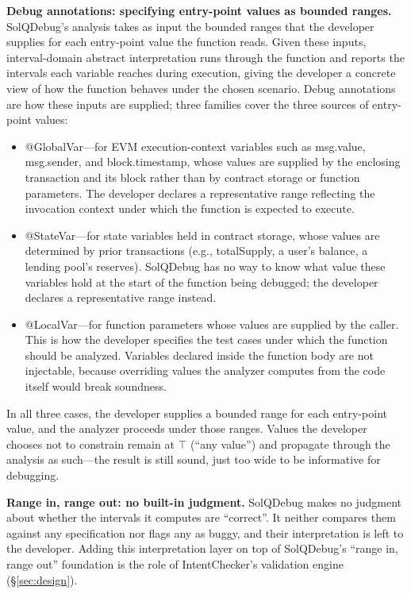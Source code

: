 \documentclass[pdflatex,sn-basic]{sn-jnl}%
\theoremstyle{thmstyleone}%
\theoremstyle{thmstyletwo}%
\theoremstyle{thmstylethree}%
\begin{document}
\smallskip
\noindent\textbf{Debug annotations: specifying entry-point values as bounded ranges.}
SolQDebug's analysis takes as input the bounded ranges that the developer supplies for each entry-point value the function reads.
Given these inputs, interval-domain abstract interpretation runs through the function and reports the intervals each variable reaches during execution, giving the developer a concrete view of how the function behaves under the chosen scenario.
Debug annotations are how these inputs are supplied; three families cover the three sources of entry-point values:
\begin{itemize}
    \item @GlobalVar---for EVM execution-context variables such as msg.value, msg.sender, and block.timestamp, whose values are supplied by the enclosing transaction and its block rather than by contract storage or function parameters. The developer declares a representative range reflecting the invocation context under which the function is expected to execute.
    \item @StateVar---for state variables held in contract storage, whose values are determined by prior transactions (e.g., totalSupply, a user's balance, a lending pool's reserves). SolQDebug has no way to know what value these variables hold at the start of the function being debugged; the developer declares a representative range instead.
    \item @LocalVar---for function parameters whose values are supplied by the caller. This is how the developer specifies the test cases under which the function should be analyzed. Variables declared inside the function body are not injectable, because overriding values the analyzer computes from the code itself would break soundness.
\end{itemize}
In all three cases, the developer supplies a bounded range for each entry-point value, and the analyzer proceeds under those ranges.
Values the developer chooses not to constrain remain at $\top$ (``any value'') and propagate through the analysis as such---the result is still sound, just too wide to be informative for debugging.

\smallskip
\noindent\textbf{Range in, range out: no built-in judgment.}
SolQDebug makes no judgment about whether the intervals it computes are ``correct''. It neither compares them against any specification nor flags any as buggy, and their interpretation is left to the developer.
Adding this interpretation layer on top of SolQDebug's ``range in, range out'' foundation is the role of IntentChecker's validation engine (§\ref{sec:design}).
\end{document}
